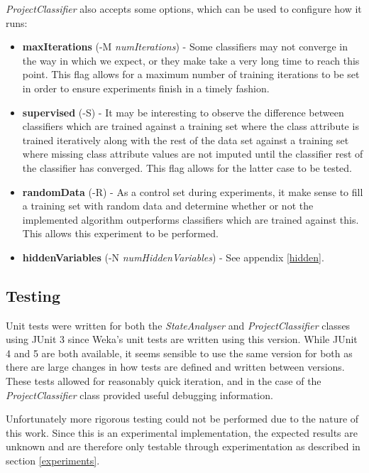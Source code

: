 \textit{ProjectClassifier} also accepts some options, which can be used to configure how it runs:
\begin{itemize}
\item \textbf{maxIterations} (-M \textit{numIterations}) - Some classifiers may not converge in the way in which we expect, or they make take a very long time to reach this point. This flag allows for a maximum number of training iterations to be set in order to ensure experiments finish in a timely fashion.
\item \textbf{supervised} (-S) - It may be interesting to observe the difference between classifiers which are trained against a training set where the class attribute is trained iteratively along with the rest of the data set against a training set where missing class attribute values are not imputed until the classifier rest of the classifier has converged. This flag allows for the latter case to be tested.
\item \textbf{randomData} (-R) - As a control set during experiments, it make sense to fill a training set with random data and determine whether or not the implemented algorithm outperforms classifiers which are trained against this. This allows this experiment to be performed.
\item \textbf{hiddenVariables} (-N \textit{numHiddenVariables}) - See appendix \ref{hidden}.
\end{itemize}

\subsection{Testing}

Unit tests were written for both the \textit{StateAnalyser} and \textit{ProjectClassifier} classes using JUnit 3 since Weka's unit tests are written using this version. While JUnit 4 and 5 are both available, it seems sensible to use the same version for both as there are large changes in how tests are defined and written between versions. These tests allowed for reasonably quick iteration, and in the case of the \textit{ProjectClassifier} class provided useful debugging information.

Unfortunately more rigorous testing could not be performed due to the nature of this work. Since this is an experimental implementation, the expected results are unknown and are therefore only testable through experimentation as described in section \ref{experiments}.